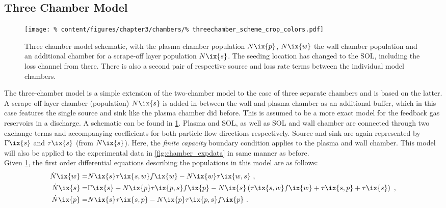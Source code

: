         \subsection{Three Chamber Model}\label{subsec:threechamb}%
%
            \begin{figure}[t]%
                \centering%
                \texttt{[image: \%
                    content/figures/chapter3/chambers/\%
                    threechamber\_scheme\_crop\_colors.pdf]}%
                \caption{Three chamber model schematic, with the plasma chamber population $N\ix{p}$, $N\ix{w}$ the wall chamber population and an additional chamber for a scrape-off layer population $N\ix{s}$. The seeding location has changed to the SOL, including the loss channel from there. There is also a second pair of respective source and loss rate terms between the individual model chambers.}\label{fig:threechamber_schematic}%
            \end{figure}%
%
            The three-chamber model is a simple extension of the two-chamber model to the case of three separate chambers and is based on the latter. A scrape-off layer chamber (population) $N\ix{s}$ is added in-between the wall and plasma chamber as an additional buffer, which in this case features the single source and sink like the plasma chamber did before. This is assumed to be a more exact model for the feedback gas reservoirs in a discharge. A schematic can be found in \cref{fig:threechamber_schematic}. Plasma and SOL, as well as SOL and wall chamber are connected through two exchange terms and accompanying coefficients for both particle flow directions respectively. Source and sink are again represented by $\Gamma\ix{s}$ and $\tau\ix{s}$ (from $N\ix{s}$). Here, the \textit{finite capacity} boundary condition applies to the plasma and wall chamber. This model will also be applied to the experimental data in \cref{fig:chamber_expdata} in same manner as before.\\%
            Given \cref{fig:threechamber_schematic}, the first order differential equations describing the populations in this model are as follows:%
%
            \begin{align}%
                \begin{split}\label{eq:threechamber_base}%
                    \dot{N}\ix{w}=&N\ix{s}\tau\ix{s,w}f\ix{w}-N\ix{w}\tau\ix{w,s}\,\,,\\%
                    \dot{N}\ix{s}=&\Gamma\ix{s}+N\ix{p}\tau\ix{p,s}f\ix{p}-N\ix{s}\left(\tau\ix{s,w}f\ix{w}+\tau\ix{s,p}+\tau\ix{s}\right)\,\,,\\%
                    \dot{N}\ix{p}=&N\ix{s}\tau\ix{s,p}-N\ix{p}\tau\ix{p,s}f\ix{p}\,\,.%
                \end{split}%
            \end{align}%
